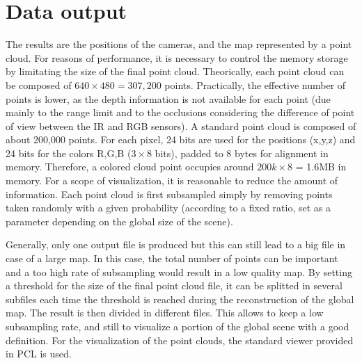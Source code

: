 %
%

\section{Data output}

The results are the positions of the cameras, and the map represented by a point cloud. For reasons of performance, it is necessary to control the memory storage by limitating the size of the final point cloud. Theorically, each point cloud can be composed of $640\times480 = 307,200$ points. Practically, the effective number of points is lower, as the depth information is not available for each point (due mainly to the range limit and to the occlusions considering the difference of point of view between the IR and RGB sensors). A standard point cloud is composed of about 200,000 points. For each pixel, 24 bits are used for the positions (x,y,z) and 24 bits for the colors R,G,B ($3\times8$ bits), padded to 8 bytes for alignment in memory. Therefore, a colored cloud point occupies around $200k\times8$ = 1.6MB in memory. For a scope of visualization, it is reasonable to reduce the amount of information. Each point cloud is first subsampled simply by removing points taken randomly with a given probability (according to a fixed ratio, set as a parameter depending on the global size of the scene).

Generally, only one output file is produced but this can still lead to a big file in case of a large map. In this case, the total number of points can be  important and a too high rate of subsampling would result in a low quality map. By setting a threshold for the size of the final point cloud file, it can be splitted in several subfiles each time the threshold is reached during the reconstruction of the global map. The result is then divided in different files. This allows to keep a low subsampling rate, and still to visualize a portion of the global scene with a good definition. For the visualization of the point clouds, the standard viewer provided in \gls{PCL} is used.

